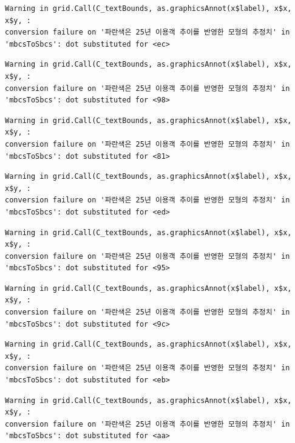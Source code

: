 \documentclass[
  letterpaper,
  DIV=11,
  numbers=noendperiod]{scrreprt}
\begin{document}
\begin{verbatim}
Warning in grid.Call(C_textBounds, as.graphicsAnnot(x$label), x$x, x$y, :
conversion failure on '파란색은 25년 이용객 추이를 반영한 모형의 추정치' in
'mbcsToSbcs': dot substituted for <ec>
\end{verbatim}

\begin{verbatim}
Warning in grid.Call(C_textBounds, as.graphicsAnnot(x$label), x$x, x$y, :
conversion failure on '파란색은 25년 이용객 추이를 반영한 모형의 추정치' in
'mbcsToSbcs': dot substituted for <98>
\end{verbatim}

\begin{verbatim}
Warning in grid.Call(C_textBounds, as.graphicsAnnot(x$label), x$x, x$y, :
conversion failure on '파란색은 25년 이용객 추이를 반영한 모형의 추정치' in
'mbcsToSbcs': dot substituted for <81>
\end{verbatim}

\begin{verbatim}
Warning in grid.Call(C_textBounds, as.graphicsAnnot(x$label), x$x, x$y, :
conversion failure on '파란색은 25년 이용객 추이를 반영한 모형의 추정치' in
'mbcsToSbcs': dot substituted for <ed>
\end{verbatim}

\begin{verbatim}
Warning in grid.Call(C_textBounds, as.graphicsAnnot(x$label), x$x, x$y, :
conversion failure on '파란색은 25년 이용객 추이를 반영한 모형의 추정치' in
'mbcsToSbcs': dot substituted for <95>
\end{verbatim}

\begin{verbatim}
Warning in grid.Call(C_textBounds, as.graphicsAnnot(x$label), x$x, x$y, :
conversion failure on '파란색은 25년 이용객 추이를 반영한 모형의 추정치' in
'mbcsToSbcs': dot substituted for <9c>
\end{verbatim}

\begin{verbatim}
Warning in grid.Call(C_textBounds, as.graphicsAnnot(x$label), x$x, x$y, :
conversion failure on '파란색은 25년 이용객 추이를 반영한 모형의 추정치' in
'mbcsToSbcs': dot substituted for <eb>
\end{verbatim}

\begin{verbatim}
Warning in grid.Call(C_textBounds, as.graphicsAnnot(x$label), x$x, x$y, :
conversion failure on '파란색은 25년 이용객 추이를 반영한 모형의 추정치' in
'mbcsToSbcs': dot substituted for <aa>
\end{verbatim}
\end{document}
